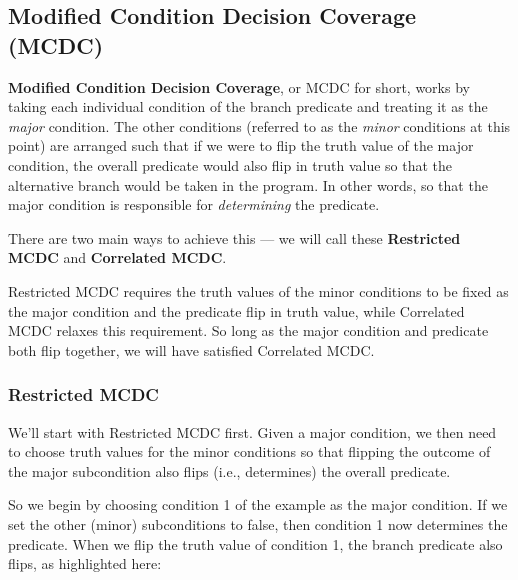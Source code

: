 
\subsection{Modified Condition Decision Coverage (MCDC)}


{\bf Modified Condition Decision Coverage}, or MCDC for short, works by taking
each individual condition of the branch predicate and treating it as the {\it
major} condition. The other conditions (referred to as the {\it minor}
conditions at this point) are arranged such that if we were to flip the truth
value of the major condition, the overall predicate would also flip in truth
value so that the alternative branch would be taken in the program. In other
words, so that the major condition is responsible for {\it determining} the
predicate. 

There are two main ways to achieve this --- we will call these {\bf Restricted
MCDC} and {\bf Correlated MCDC}. 

Restricted MCDC requires the truth values of the minor conditions to be fixed as
the major condition and the predicate flip in truth value, while Correlated MCDC
relaxes this requirement. So long as the major condition and predicate both flip
together, we will have satisfied Correlated MCDC.


\subsubsection*{Restricted MCDC}

We'll start with Restricted MCDC first. Given a major condition, we then need to
choose truth values for the minor conditions so that flipping the outcome of the
major subcondition also flips (i.e., determines) the overall predicate.

So we begin by choosing condition 1 of the
\daysbetweentwodatesmethod example as the major condition. If we
set the other (minor) subconditions to false, then condition 1 now determines
the predicate. When we flip the truth value of condition 1, the branch predicate
also flips, as highlighted here:


